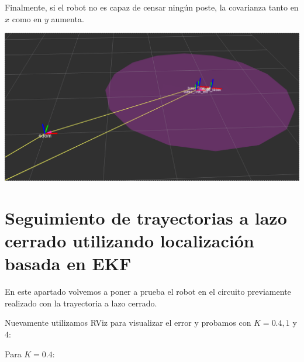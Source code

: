 Finalmente, si el robot no es capaz de censar ningún poste, la covarianza tanto en $x$ como en $y$ aumenta.

\includegraphics[scale=0.3]{punto4/ekfSinVerNingunPoste.png}


\section{Seguimiento de trayectorias a lazo cerrado utilizando localización basada en EKF}

En este apartado volvemos a poner a prueba el robot en el circuito previamente realizado con la trayectoria a lazo cerrado.

Nuevamente utilizamos RViz para visualizar el error y probamos con $K= 0.4,1$ y $4$:

Para $K=0.4$:

